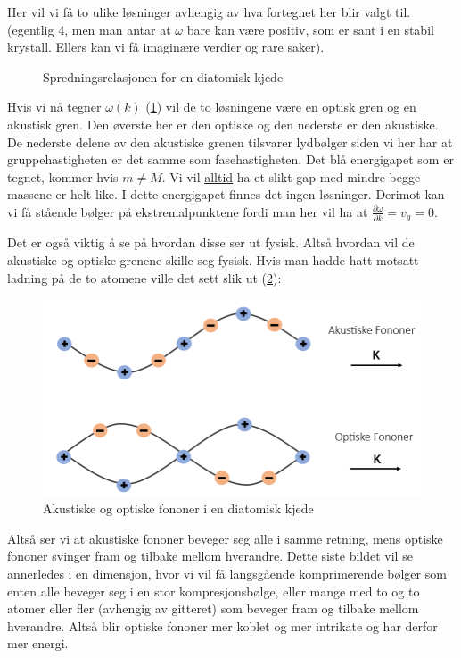 \documentclass{article}
\begin{document}
Her vil vi få to ulike løsninger avhengig av hva fortegnet her blir valgt til. (egentlig 4, men man antar at $\omega$ bare kan være positiv, som er sant i en stabil krystall. Ellers kan vi få imaginære verdier og rare saker). 
\begin{figure}
    \centering
    \label{fig:sprednings_relasjon_diatomisk_kjede}
    \caption{Spredningsrelasjonen for en diatomisk kjede}
\end{figure}
Hvis vi nå tegner $\omega(k)$ (\ref{fig:sprednings_relasjon_diatomisk_kjede}) vil de to løsningene være en optisk gren og en akustisk gren. Den øverste her er den optiske og den nederste er den akustiske. De nederste delene av den akustiske grenen tilsvarer lydbølger siden vi her har at gruppehastigheten er det samme som fasehastigheten. Det blå energigapet som er tegnet, kommer hvis $m \ne M$. Vi vil \underline{alltid} ha et slikt gap med mindre begge massene er helt like. I dette energigapet finnes det ingen løsninger. Derimot kan vi få stående bølger på ekstremalpunktene fordi man her vil ha at $\frac{\partial \omega}{\partial k} = v_g = 0$.

Det er også viktig å se på hvordan disse ser ut fysisk. Altså hvordan vil de akustiske og optiske grenene skille seg fysisk. Hvis man hadde hatt motsatt ladning på de to atomene ville det sett slik ut (\ref{fig:akustiske_og_optiske_fononer_diatomisk_kjede}):
\begin{figure}[H]
    \centering
    \includegraphics[width=0.5\linewidth]{bilder/akustiske_og_optiske_fononer_diatomisk_kjede.png}
    \caption{Akustiske og optiske fononer i en diatomisk kjede}
    \label{fig:akustiske_og_optiske_fononer_diatomisk_kjede}
\end{figure}
Altså ser vi at akustiske fononer beveger seg alle i samme retning, mens optiske fononer svinger fram og tilbake mellom hverandre. Dette siste bildet vil se annerledes i en dimensjon, hvor vi vil få langsgående komprimerende bølger som enten alle beveger seg i en stor kompresjonsbølge, eller mange med to og to atomer eller fler (avhengig av gitteret) som beveger fram og tilbake mellom hverandre. Altså blir optiske fononer mer koblet og mer intrikate og har derfor mer energi.
\end{document}
